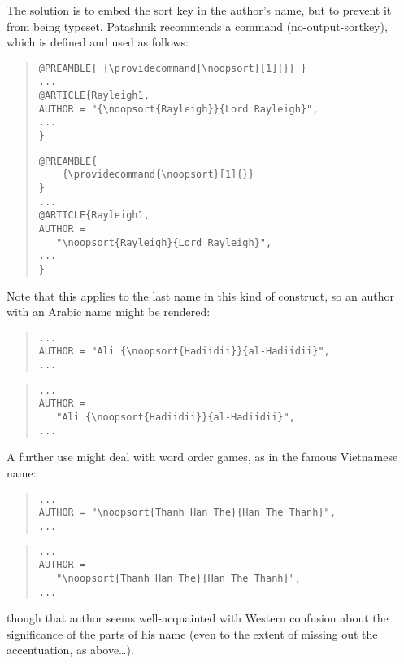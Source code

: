 The solution is to embed the sort key in the author's name, but to
prevent it from being typeset.  Patashnik recommends a command
 (no-output-sortkey), which is defined and used as
follows:
\begin{quote}
\begin{wideversion}
\begin{verbatim}
@PREAMBLE{ {\providecommand{\noopsort}[1]{}} }
...
@ARTICLE{Rayleigh1,
AUTHOR = "{\noopsort{Rayleigh}}{Lord Rayleigh}",
...
}
\end{verbatim}
\end{wideversion}
\begin{narrowversion}
\begin{verbatim}
@PREAMBLE{
    {\providecommand{\noopsort}[1]{}}
}
...
@ARTICLE{Rayleigh1,
AUTHOR = 
   "\noopsort{Rayleigh}{Lord Rayleigh}",
...
}
\end{verbatim}
\end{narrowversion}
\end{quote}
Note that this  applies to the last name in this kind of
construct, so an author with an Arabic name might be rendered:
\begin{wideversion}
\begin{quote}
\begin{verbatim}
...
AUTHOR = "Ali {\noopsort{Hadiidii}}{al-Hadiidii}",
...
\end{verbatim}
\end{quote}
\end{wideversion}
\begin{narrowversion}
\begin{quote}
\begin{verbatim}
...
AUTHOR = 
   "Ali {\noopsort{Hadiidii}}{al-Hadiidii}",
...
\end{verbatim}
\end{quote}
\end{narrowversion}
A further use might deal with word order games, as in the famous
Vietnamese name:
\begin{wideversion}
\begin{quote}
\begin{verbatim}
...
AUTHOR = "\noopsort{Thanh Han The}{Han The Thanh}",
...
\end{verbatim}
\end{quote}
\end{wideversion}
\begin{narrowversion}
\begin{quote}
\begin{verbatim}
...
AUTHOR =
   "\noopsort{Thanh Han The}{Han The Thanh}",
...
\end{verbatim}
\end{quote}
\end{narrowversion}
though that author seems well-acquainted with Western confusion about
the significance of the parts of his name (even to the extent of
missing out the accentuation, as above\dots{}).

